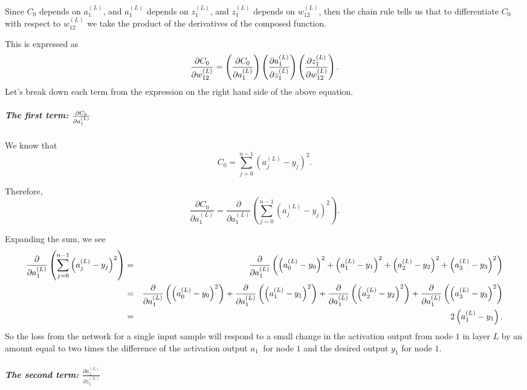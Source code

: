\documentclass{article}
\begin{document}
Since $C_{0}$ depends on $a_{1}^{\left( L\right) }$, and $a_{1}^{\left(
L\right) }$ depends on $z_{1}^{(L)}$, and $z_{1}^{(L)}$ depends on $%
w_{12}^{(L)}$, then the chain rule tells us that to differentiate $C_{0}$
with respect to $w_{12}^{(L)}$ we take the product of the derivatives of the
composed function.

This is expressed as 
\[
\frac{\partial C_{0}}{\partial w_{12}^{(L)}}=\left( \frac{\partial C_{0}}{%
\partial a_{1}^{(L)}}\right) \left( \frac{\partial a_{1}^{(L)}}{\partial
z_{1}^{(L)}}\right) \left( \frac{\partial z_{1}^{(L)}}{\partial w_{12}^{(L)}}%
\right) \text{.} 
\]%
Let's break down each term from the expression on the right hand side of the
above equation.

\subparagraph{\protect\vspace{1pt}The first term: $\frac{\partial C_{0}}{%
\partial a_{1}^{(L)}}$}

We know that%
\[
C_{0}=\sum_{j=0}^{n-1}\left( a_{j}^{(L)}-y_{j}\right) ^{2}\text{.} 
\]

Therefore,%
\[
\frac{\partial C_{0}}{\partial a_{1}^{(L)}}=\frac{\partial }{\partial
a_{1}^{(L)}}\left( \sum_{j=0}^{n-1}\left( a_{j}^{(L)}-y_{j}\right)
^{2}\right) \text{.} 
\]

Expanding the sum, we see%
\begin{eqnarray*}
\frac{\partial }{\partial a_{1}^{(L)}}\left( \sum_{j=0}^{n-1}\left(
a_{j}^{(L)}-y_{j}\right) ^{2}\right) &=&\frac{\partial }{\partial a_{1}^{(L)}%
}\left( \left( a_{0}^{(L)}-y_{0}\right) ^{2}+\left( a_{1}^{(L)}-y_{1}\right)
^{2}+\left( a_{2}^{(L)}-y_{2}\right) ^{2}+\left( a_{3}^{(L)}-y_{3}\right)
^{2}\right) \\
&=&\frac{\partial }{\partial a_{1}^{(L)}}\left( \left(
a_{0}^{(L)}-y_{0}\right) ^{2}\right) +\frac{\partial }{\partial a_{1}^{(L)}}%
\left( \left( a_{1}^{(L)}-y_{1}\right) ^{2}\right) +\frac{\partial }{%
\partial a_{1}^{(L)}}\left( \left( a_{2}^{(L)}-y_{2}\right) ^{2}\right) +%
\frac{\partial }{\partial a_{1}^{(L)}}\left( \left( a_{3}^{(L)}-y_{3}\right)
^{2}\right) \\
&=&2\left( a_{1}^{\left( L\right) }-y_{1}\right) \text{.}
\end{eqnarray*}
So the loss from the network for a single input sample will respond to a
small change in the activation output from node $1$ in layer $L$ by an
amount equal to two times the difference of the activation output $a_{1}\ $%
for node $1$ and the desired output $y_{1}$ for node $1$.

\subparagraph{The second term: $\frac{\partial a_{1}^{(L)}}{\partial
z_{1}^{(L)}}$}
\end{document}
